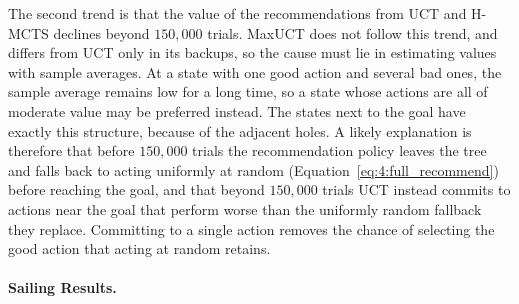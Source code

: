     The second trend is that the value of the recommendations from UCT and H-MCTS declines beyond $150{,}000$ trials. MaxUCT does not follow this trend, and differs from UCT only in its backups, so the cause must lie in estimating values with sample averages. At a state with one good action and several bad ones, the sample average remains low for a long time, so a state whose actions are all of moderate value may be preferred instead. The states next to the goal have exactly this structure, because of the adjacent holes. A likely explanation is therefore that before $150{,}000$ trials the recommendation policy leaves the tree and falls back to acting uniformly at random (Equation~\ref{eq:4:full_recommend}) before reaching the goal, and that beyond $150{,}000$ trials UCT instead commits to actions near the goal that perform worse than the uniformly random fallback they replace. Committing to a single action removes the chance of selecting the good action that acting at random retains. 
    





    \paragraph{Sailing Results.}

